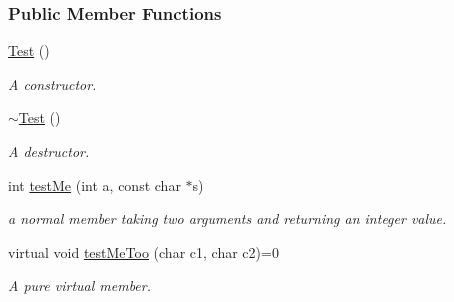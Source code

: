 \subsubsection*{Public Member Functions}
\begin{DoxyCompactItemize}
\item 
\hyperlink{classTest_a99f2bbfac6c95612322b0f10e607ebe5}{Test} ()
\begin{DoxyCompactList}\small\item\em A constructor. \end{DoxyCompactList}\item 
\hyperlink{classTest_a2b0a62f1e667bbe8d8cb18d785bfa991}{$\sim$\-Test} ()
\begin{DoxyCompactList}\small\item\em A destructor. \end{DoxyCompactList}\item 
int \hyperlink{classTest_af7115d71dda64654a7104c24f130e8d0}{test\-Me} (int a, const char $\ast$s)
\begin{DoxyCompactList}\small\item\em a normal member taking two arguments and returning an integer value. \end{DoxyCompactList}\item 
virtual void \hyperlink{classTest_a3edb9fdc1e9f0d5274b57386ab03704c}{test\-Me\-Too} (char c1, char c2)=0
\begin{DoxyCompactList}\small\item\em A pure virtual member. \end{DoxyCompactList}\end{DoxyCompactItemize}
